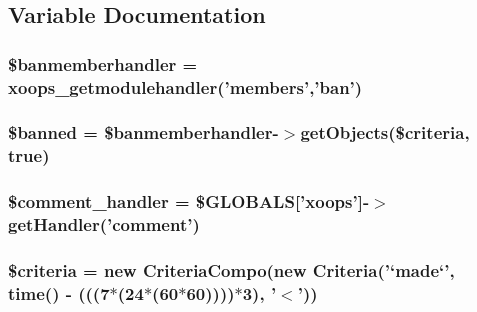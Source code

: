 \subsection{Variable Documentation}
\hypertarget{cron_2unbanner_8php_a787f648c22cbfb8f2a898edb32eee3e6}{
\subsubsection[{\$banmemberhandler}]{\setlength{\rightskip}{0pt plus 5cm}\$banmemberhandler = xoops\-\_\-getmodulehandler('members','ban')}}\label{cron_2unbanner_8php_a787f648c22cbfb8f2a898edb32eee3e6}
\hypertarget{cron_2unbanner_8php_a910690950e9ee9823bdd1f8f7a7055a9}{
\subsubsection[{\$banned}]{\setlength{\rightskip}{0pt plus 5cm}\$banned = \$banmemberhandler-\/$>$get\-Objects(\$criteria, true)}}\label{cron_2unbanner_8php_a910690950e9ee9823bdd1f8f7a7055a9}
\hypertarget{cron_2unbanner_8php_a8a2604af20e56f0769bf45487438b167}{
\subsubsection[{\$comment\-\_\-handler}]{\setlength{\rightskip}{0pt plus 5cm}\$comment\-\_\-handler = \$G\-L\-O\-B\-A\-L\-S\mbox{[}'xoops'\mbox{]}-\/$>$get\-Handler('comment')}}\label{cron_2unbanner_8php_a8a2604af20e56f0769bf45487438b167}
\hypertarget{cron_2unbanner_8php_a095f2061791cf4be58c4b41a5790dc85}{
\subsubsection[{\$criteria}]{\setlength{\rightskip}{0pt plus 5cm}\$criteria = new Criteria\-Compo(new Criteria('`made`', time() -\/ (((7$\ast$(24$\ast$(60$\ast$60))))$\ast$3), '$<$'))}}\label{cron_2unbanner_8php_a095f2061791cf4be58c4b41a5790dc85}

